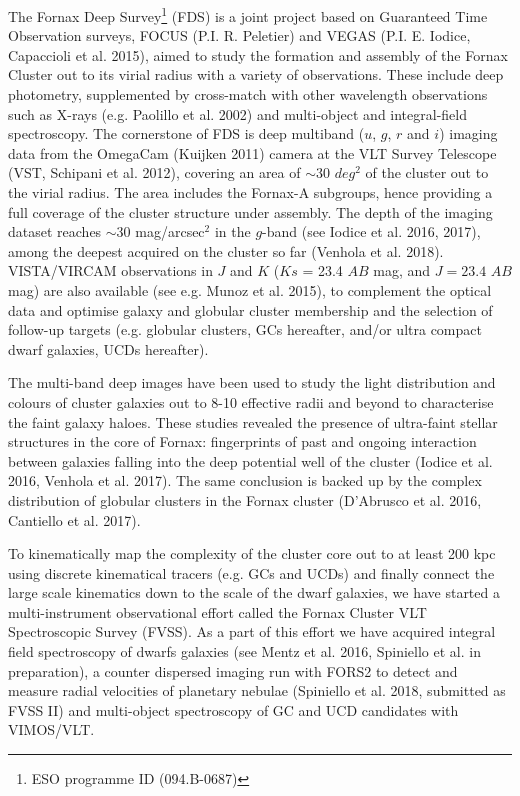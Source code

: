 \documentclass[useAMS,usenatbib]{mn2e}
\begin{document}
The Fornax Deep Survey\footnote{ESO programme ID (094.B-0687)} (FDS) is a joint 
project based on Guaranteed Time Observation surveys, FOCUS (P.I. R. Peletier) 
and VEGAS (P.I. E. Iodice, Capaccioli et al. 2015), aimed to study the 
formation and assembly of the Fornax Cluster out to its virial radius with a 
variety of observations. These include
deep photometry, supplemented by cross-match with other wavelength observations 
such as  X-rays (e.g. Paolillo et al. 2002) and multi-object and integral-field 
spectroscopy.
The cornerstone of FDS is deep multiband ($u$, $g$, $r$ and $i$) imaging data 
from the OmegaCam (Kuijken 2011) camera at the VLT Survey Telescope (VST, 
Schipani et al. 2012), covering an area of $\sim30$ $deg^2$ of the cluster out 
to the virial radius. The area includes the Fornax-A subgroups, hence providing 
a full coverage of the cluster structure under assembly.  The depth of the 
imaging dataset reaches $\sim 30$ mag/arcsec$^2$ in the $g$-band (see Iodice et 
al. 2016, 2017), among the deepest acquired on the cluster so far (Venhola et 
al. 2018). VISTA/VIRCAM observations in $J$ and $K$ ($Ks$ = 23.4 $AB$ mag, and 
$J = 23.4$ $AB$ mag) are also available (see e.g. Munoz et al. 2015), to 
complement the optical data and optimise galaxy and globular cluster membership 
and the selection of follow-up targets (e.g. globular clusters, GCs hereafter, 
and/or ultra compact dwarf galaxies, UCDs hereafter). 

The multi-band deep images have been used to study the light distribution and 
colours of cluster galaxies out to 8-10 effective radii and beyond to 
characterise the faint galaxy haloes. These studies revealed the presence of 
ultra-faint stellar structures in the core of Fornax: fingerprints of past and 
ongoing interaction between galaxies falling into the deep potential well of 
the cluster (Iodice et al. 2016, Venhola et al. 2017). The same conclusion is 
backed up by the complex distribution of globular clusters in the Fornax 
cluster (D’Abrusco et al. 2016, Cantiello et al. 2017).

To kinematically map the complexity of the cluster core out to at least 200 kpc 
using discrete kinematical tracers (e.g. GCs and UCDs) and finally connect the 
large scale kinematics down to the scale of the dwarf galaxies, we have started 
a multi-instrument observational effort called the Fornax Cluster VLT 
Spectroscopic Survey (FVSS). As a part of this effort we have acquired integral 
field spectroscopy of dwarfs galaxies (see Mentz et al. 2016, Spiniello et al. 
in preparation), a counter dispersed imaging run with FORS2 to detect and 
measure radial velocities of planetary nebulae (Spiniello et al. 2018, 
submitted as FVSS II) and multi-object spectroscopy of GC and UCD candidates 
with VIMOS/VLT.
\end{document}
